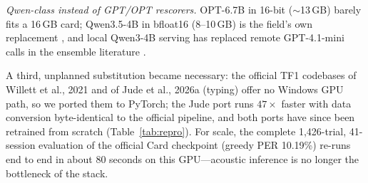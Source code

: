 \documentclass[11pt]{article}
\begin{document}
\emph{Qwen-class instead of GPT/OPT rescorers.} OPT-6.7B in 16-bit
($\sim$13\,GB) barely fits a 16\,GB card; Qwen3.5-4B in bfloat16
(8--10\,GB) is the field's own replacement \cite{fogg2026}, and local
Qwen3-4B serving has replaced remote GPT-4.1-mini calls in the ensemble
literature \cite{yoon2026}.

A third, unplanned substitution became necessary: the official TF1
codebases of Willett et al., 2021 and of Jude et al., 2026a (typing)
offer no Windows GPU path, so we ported them to PyTorch; the Jude port
runs $47\times$ faster with data conversion byte-identical to the
official pipeline, and both ports have since been retrained from
scratch (Table~\ref{tab:repro}).
For scale, the complete 1{,}426-trial, 41-session evaluation of the
official Card checkpoint (greedy PER 10.19\%) re-runs end to end in
about 80 seconds on this GPU---acoustic inference is no longer the
bottleneck of the stack.
\end{document}
